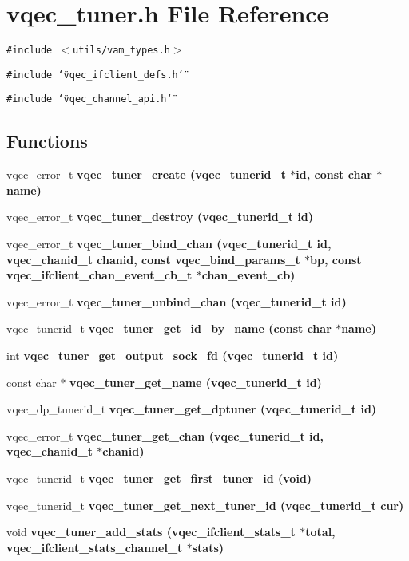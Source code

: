 \section{vqec\_\-tuner.h File Reference}
\label{vqec__tuner_8h}
{\tt \#include $<$utils/vam\_\-types.h$>$}\par
{\tt \#include \char`\"{}vqec\_\-ifclient\_\-defs.h\char`\"{}}\par
{\tt \#include \char`\"{}vqec\_\-channel\_\-api.h\char`\"{}}\par
\subsection*{Functions}
\begin{CompactItemize}
\item 
vqec\_\-error\_\-t \bf{vqec\_\-tuner\_\-create} (vqec\_\-tunerid\_\-t $\ast$id, const char $\ast$name)
\item 
vqec\_\-error\_\-t \bf{vqec\_\-tuner\_\-destroy} (vqec\_\-tunerid\_\-t id)
\item 
vqec\_\-error\_\-t \bf{vqec\_\-tuner\_\-bind\_\-chan} (vqec\_\-tunerid\_\-t id, \bf{vqec\_\-chanid\_\-t} chanid, const \bf{vqec\_\-bind\_\-params\_\-t} $\ast$bp, const \bf{vqec\_\-ifclient\_\-chan\_\-event\_\-cb\_\-t} $\ast$chan\_\-event\_\-cb)
\item 
vqec\_\-error\_\-t \bf{vqec\_\-tuner\_\-unbind\_\-chan} (vqec\_\-tunerid\_\-t id)
\item 
vqec\_\-tunerid\_\-t \bf{vqec\_\-tuner\_\-get\_\-id\_\-by\_\-name} (const char $\ast$name)
\item 
int \bf{vqec\_\-tuner\_\-get\_\-output\_\-sock\_\-fd} (vqec\_\-tunerid\_\-t id)
\item 
const char $\ast$ \bf{vqec\_\-tuner\_\-get\_\-name} (vqec\_\-tunerid\_\-t id)
\item 
vqec\_\-dp\_\-tunerid\_\-t \bf{vqec\_\-tuner\_\-get\_\-dptuner} (vqec\_\-tunerid\_\-t id)
\item 
vqec\_\-error\_\-t \bf{vqec\_\-tuner\_\-get\_\-chan} (vqec\_\-tunerid\_\-t id, \bf{vqec\_\-chanid\_\-t} $\ast$chanid)
\item 
vqec\_\-tunerid\_\-t \bf{vqec\_\-tuner\_\-get\_\-first\_\-tuner\_\-id} (void)
\item 
vqec\_\-tunerid\_\-t \bf{vqec\_\-tuner\_\-get\_\-next\_\-tuner\_\-id} (vqec\_\-tunerid\_\-t cur)
\item 
void \bf{vqec\_\-tuner\_\-add\_\-stats} (\bf{vqec\_\-ifclient\_\-stats\_\-t} $\ast$total, \bf{vqec\_\-ifclient\_\-stats\_\-channel\_\-t} $\ast$stats)

\end{CompactItemize}
